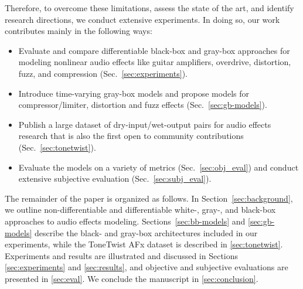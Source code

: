 Therefore, to overcome these limitations, assess the state of the art, and identify research directions, we conduct extensive experiments.
In doing so, our work contributes mainly in the following ways:
\begin{itemize}
    \item Evaluate and compare differentiable black-box and gray-box approaches for modeling nonlinear audio effects like guitar amplifiers, overdrive, distortion, fuzz, and compression (Sec.~\ref{sec:experiments}).
    \item Introduce time-varying gray-box models and propose models for compressor/limiter, distortion and fuzz effects (Sec.~\ref{sec:gb-models}).
    \item Publish a large dataset of dry-input/wet-output pairs for audio effects research that is also the first open to community contributions (Sec.~\ref{sec:tonetwist}).
    \item Evaluate the models on a variety of metrics (Sec.~\ref{sec:obj_eval}) and conduct extensive subjective evaluation (Sec.~\ref{sec:subj_eval}).
\end{itemize}

The remainder of the paper is organized as follows. 
In Section~\ref{sec:background}, we outline non-differentiable and differentiable white-, gray-, and black-box approaches to audio effects modeling.
Sections~\ref{sec:bb-models} and \ref{sec:gb-models} describe the black- and gray-box architectures included in our experiments, while the ToneTwist AFx dataset is described in \ref{sec:tonetwist}. 
Experiments and results are illustrated and discussed in Sections \ref{sec:experiments} and \ref{sec:results}, and objective and subjective evaluations are presented in \ref{sec:eval}. 
We conclude the manuscript in \ref{sec:conclusion}.

